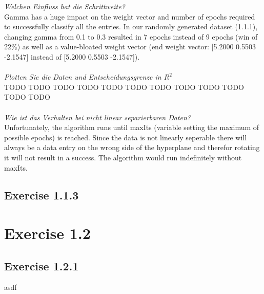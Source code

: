 \documentclass[10pt, journal,compsoc]{article}
\begin{document}
\textit{Welchen Einfluss hat die Schrittweite?}
\\
Gamma has a huge impact on the weight vector and number of epochs required to successfully classify all the entries. In our randomly generated dataset (1.1.1), changing gamma from 0.1 to 0.3 resulted in 7 epochs instead of 9 epochs (win of 22\%) as well as a value-bloated weight vector (end weight vector:  [5.2000 0.5503 -2.1547] instead of [5.2000 0.5503 -2.1547]).
\\
\\

\textit{Plotten Sie die Daten und Entscheidungsgrenze in $R^2$}
\\
TODO TODO TODO TODO TODO TODO TODO TODO TODO TODO TODO TODO
\\
\\

\textit{Wie ist das Verhalten bei nicht linear separierbaren Daten?}
\\
Unfortunately, the algorithm runs until maxIts (variable setting the maximum of possible epochs) is reached. Since the data is not linearly seperable there will always be a data entry on the wrong side of the hyperplane and therefor rotating it will not result in a success. The algorithm would run indefinitely without maxIts. 

\subsection{Exercise 1.1.3}

\section{Exercise 1.2}
\subsection{Exercise 1.2.1}
asdf
\end{document}
